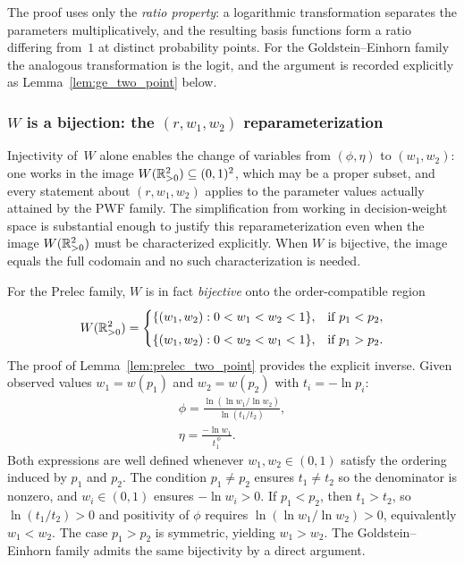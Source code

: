 The proof uses only the \emph{ratio property}: a logarithmic
transformation separates the parameters multiplicatively, and the
resulting basis functions form a ratio differing from~$1$ at
distinct probability points. For the Goldstein--Einhorn family the
analogous transformation is the logit, and the argument is recorded
explicitly as Lemma~\ref{lem:ge_two_point} below.


\subsubsection{$W$ is a bijection: the $(r, w_1, w_2)$ reparameterization}
\label{appB:W_bijection}

Injectivity of~$W$ alone enables the change of variables from
$(\phi, \eta)$ to $(w_1, w_2)$: one works in the image
$W(\mathbb{R}^2_{>0}) \subseteq (0,1)^2$, which may be a proper subset,
and every statement about $(r, w_1, w_2)$ applies to the parameter
values actually attained by the PWF family. The simplification
from working in decision-weight space is substantial enough to
justify this reparameterization even when the image $W(\mathbb{R}^2_{>0})$
must be characterized explicitly. When $W$ is bijective, the image
equals the full codomain and no such characterization is needed.

For the Prelec family, $W$ is in fact \emph{bijective} onto the
order-compatible region
\begin{equation}\label{eq:order_compatible}
  W(\mathbb{R}^2_{>0}) =
  \begin{cases}
    \{(w_1, w_2) : 0 < w_1 < w_2 < 1\}, & \text{if } p_1 < p_2, \\[4pt]
    \{(w_1, w_2) : 0 < w_2 < w_1 < 1\}, & \text{if } p_1 > p_2.
  \end{cases}
\end{equation}
The proof of Lemma~\ref{lem:prelec_two_point} provides the explicit
inverse. Given observed values $w_1 = w(p_1)$ and
$w_2 = w(p_2)$ with $t_i = -\ln p_i$:
\begin{equation}\label{eq:W_inverse}
  \begin{aligned}
    \phi = \frac{\ln(\ln w_1 / \ln w_2)}{\ln(t_1 / t_2)},
    \\
    \eta = \frac{-\ln w_1}{t_1^{\,\phi}}.
  \end{aligned}
\end{equation}
Both expressions are well defined whenever $w_1, w_2 \in (0,1)$
satisfy the ordering induced by $p_1$ and $p_2$. The condition
$p_1 \neq p_2$ ensures $t_1 \neq t_2$ so the denominator is nonzero,
and $w_i \in (0,1)$ ensures $-\ln w_i > 0$. If $p_1 < p_2$, then
$t_1 > t_2$, so $\ln(t_1/t_2) > 0$ and positivity of $\phi$ requires
$\ln(\ln w_1 / \ln w_2) > 0$, equivalently $w_1 < w_2$.
The case $p_1 > p_2$ is symmetric, yielding $w_1 > w_2$.
The Goldstein--Einhorn family admits the same bijectivity by a direct
argument.

